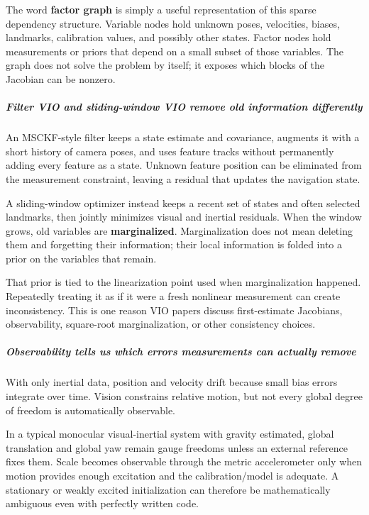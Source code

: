 The word \textbf{factor graph} is simply a useful representation of this sparse dependency structure. Variable nodes hold unknown poses, velocities, biases, landmarks, calibration values, and possibly other states. Factor nodes hold measurements or priors that depend on a small subset of those variables. The graph does not solve the problem by itself; it exposes which blocks of the Jacobian can be nonzero.

\subparagraph{Filter VIO and sliding-window VIO remove old information differently}\label{filter-vio-and-sliding-window-vio-remove-old-information-differently}

An MSCKF-style filter keeps a state estimate and covariance, augments it with a short history of camera poses, and uses feature tracks without permanently adding every feature as a state. Unknown feature position can be eliminated from the measurement constraint, leaving a residual that updates the navigation state.

A sliding-window optimizer instead keeps a recent set of states and often selected landmarks, then jointly minimizes visual and inertial residuals. When the window grows, old variables are \textbf{marginalized}. Marginalization does not mean deleting them and forgetting their information; their local information is folded into a prior on the variables that remain.

That prior is tied to the linearization point used when marginalization happened. Repeatedly treating it as if it were a fresh nonlinear measurement can create inconsistency. This is one reason VIO papers discuss first-estimate Jacobians, observability, square-root marginalization, or other consistency choices.

\subparagraph{Observability tells us which errors measurements can actually remove}\label{observability-tells-us-which-errors-measurements-can-actually-remove}

With only inertial data, position and velocity drift because small bias errors integrate over time. Vision constrains relative motion, but not every global degree of freedom is automatically observable.

In a typical monocular visual-inertial system with gravity estimated, global translation and global yaw remain gauge freedoms unless an external reference fixes them. Scale becomes observable through the metric accelerometer only when motion provides enough excitation and the calibration/model is adequate. A stationary or weakly excited initialization can therefore be mathematically ambiguous even with perfectly written code.

